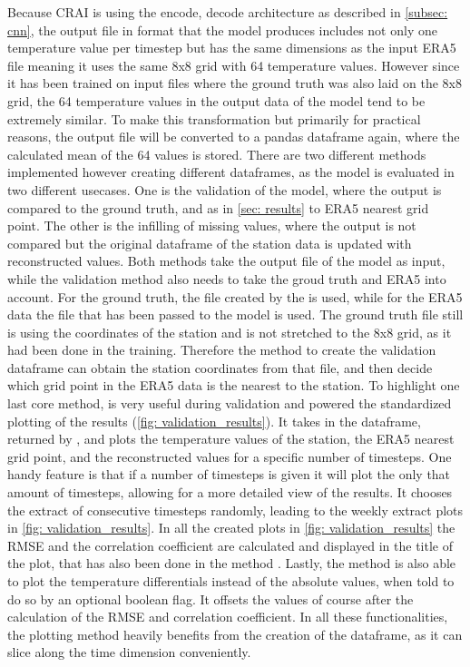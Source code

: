 Because CRAI is using the encode, decode architecture as described in \autoref{subsec: cnn}, the output file in  format that the model produces includes not only one temperature value per timestep but has the same dimensions as the input ERA5 file meaning it uses the same 8x8 grid with 64 temperature values.
However since it has been trained on input files where the ground truth was also laid on the 8x8 grid, the 64 temperature values in the output data of the model tend to be extremely similar.
To make this transformation but primarily for practical reasons, the output file will be converted to a pandas dataframe again, where the calculated mean of the 64 values is stored.
There are two different methods implemented however creating different dataframes, as the model is evaluated in two different usecases.
One is the validation of the model, where the output is compared to the ground truth, and as in \autoref{sec: results} to ERA5 nearest grid point.
The other is the infilling of missing values, where the output is not compared but the original dataframe of the station data is updated with reconstructed values.
Both methods take the output file of the model as input, while the validation method also needs to take the groud truth and ERA5 into account.
For the ground truth, the file created by the  is used, while for the ERA5 data the file that has been passed to the model is used.
The ground truth file still is using the coordinates of the station and is not stretched to the 8x8 grid, as it had been done in the training.
Therefore the method to create the validation dataframe  can obtain the station coordinates from that file, and then decide which grid point in the ERA5 data is the nearest to the station.
To highlight one last core method,  is very useful during validation and powered the standardized plotting of the results (\autoref{fig: validation_results}).
It takes in the dataframe, returned by , and plots the temperature values of the station, the ERA5 nearest grid point, and the reconstructed values for a specific number of timesteps.
One handy feature is that if a number of timesteps is given it will plot the only that amount of timesteps, allowing for a more detailed view of the results.
It chooses the extract of  consecutive timesteps randomly, leading to the weekly extract plots in \autoref{fig: validation_results}.
In all the created plots in \autoref{fig: validation_results} the RMSE and the correlation coefficient are calculated and displayed in the title of the plot,
that has also been done in the method .
Lastly, the method is also able to plot the temperature differentials instead of the absolute values, when told to do so by an optional boolean flag.
It offsets the values of course after the calculation of the RMSE and correlation coefficient.
In all these functionalities, the plotting method heavily benefits from the creation of the dataframe, as it can slice along the time dimension conveniently.